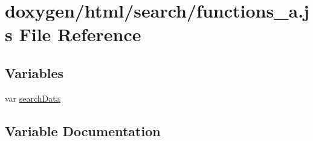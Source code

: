\hypertarget{a00093}{}\section{doxygen/html/search/functions\+\_\+a.js File Reference}
\label{a00093}
\subsection*{Variables}
\begin{DoxyCompactItemize}
\item 
var \hyperlink{a00093_ad01a7523f103d6242ef9b0451861231e}{search\+Data}
\end{DoxyCompactItemize}


\subsection{Variable Documentation}
\hypertarget{a00093_ad01a7523f103d6242ef9b0451861231e}{}
